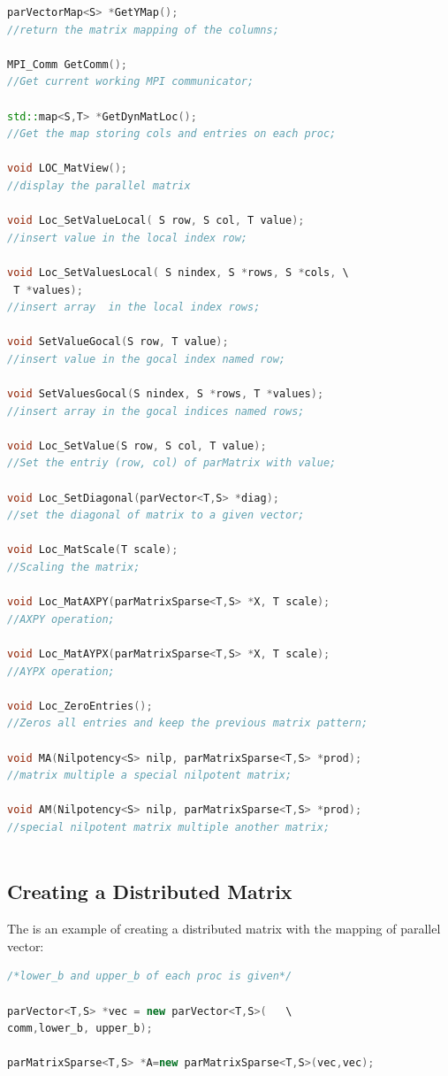 \documentclass[a4paper, 10 pt]{report}
\begin{document}
	\begin{lstlisting}[language=C++,frame=single]
parVectorMap<S> *GetYMap();
//return the matrix mapping of the columns;
	
MPI_Comm GetComm();
//Get current working MPI communicator;
	
std::map<S,T> *GetDynMatLoc();
//Get the map storing cols and entries on each proc;
	
void LOC_MatView();
//display the parallel matrix
	
void Loc_SetValueLocal( S row, S col, T value);
//insert value in the local index row;
	
void Loc_SetValuesLocal( S nindex, S *rows, S *cols, \
 T *values);
//insert array  in the local index rows;
	
void SetValueGocal(S row, T value);
//insert value in the gocal index named row;
	
void SetValuesGocal(S nindex, S *rows, T *values);
//insert array in the gocal indices named rows;
	
void Loc_SetValue(S row, S col, T value);
//Set the entriy (row, col) of parMatrix with value;
	
void Loc_SetDiagonal(parVector<T,S> *diag);
//set the diagonal of matrix to a given vector;
	
void Loc_MatScale(T scale);
//Scaling the matrix;
	
void Loc_MatAXPY(parMatrixSparse<T,S> *X, T scale);
//AXPY operation;
	
void Loc_MatAYPX(parMatrixSparse<T,S> *X, T scale);
//AYPX operation;
	
void Loc_ZeroEntries();
//Zeros all entries and keep the previous matrix pattern;
	
void MA(Nilpotency<S> nilp, parMatrixSparse<T,S> *prod);
//matrix multiple a special nilpotent matrix;
	
void AM(Nilpotency<S> nilp, parMatrixSparse<T,S> *prod);
//special nilpotent matrix multiple another matrix;
	
	\end{lstlisting}
	
	\subsection{Creating a Distributed Matrix}
	
	The is an example of creating a distributed matrix with the mapping of parallel vector:
	
	\begin{lstlisting}[language=C++,frame=single]
/*lower_b and upper_b of each proc is given*/

parVector<T,S> *vec = new parVector<T,S>(   \
comm,lower_b, upper_b);

parMatrixSparse<T,S> *A=new parMatrixSparse<T,S>(vec,vec);
	\end{lstlisting}
	
\end{document}
